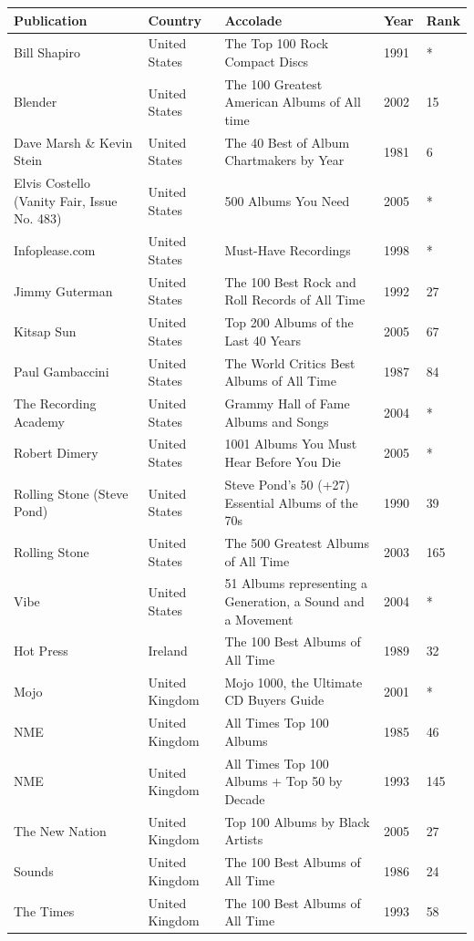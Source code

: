 \documentclass{article}
\begin{document}
\begin{tabular}{lllll}
\toprule
Publication & Country & Accolade & Year & Rank \\
\midrule
Bill Shapiro & United States & The Top 100 Rock Compact Discs & 1991 & * \\
Blender & United States & The 100 Greatest American Albums of All time & 2002 & 15 \\
Dave Marsh \& Kevin Stein & United States & The 40 Best of Album Chartmakers by Year & 1981 & 6 \\
Elvis Costello (Vanity Fair, Issue No. 483) & United States & 500 Albums You Need & 2005 & * \\
Infoplease.com & United States & Must-Have Recordings & 1998 & * \\
Jimmy Guterman & United States & The 100 Best Rock and Roll Records of All Time & 1992 & 27 \\
Kitsap Sun & United States & Top 200 Albums of the Last 40 Years & 2005 & 67 \\
Paul Gambaccini & United States & The World Critics Best Albums of All Time & 1987 & 84 \\
The Recording Academy & United States & Grammy Hall of Fame Albums and Songs & 2004 & * \\
Robert Dimery & United States & 1001 Albums You Must Hear Before You Die & 2005 & * \\
Rolling Stone (Steve Pond) & United States & Steve Pond's 50 (+27) Essential Albums of the 70s & 1990 & 39 \\
Rolling Stone & United States & The 500 Greatest Albums of All Time & 2003 & 165 \\
Vibe & United States & 51 Albums representing a Generation, a Sound and a Movement & 2004 & * \\
Hot Press & Ireland & The 100 Best Albums of All Time & 1989 & 32 \\
Mojo & United Kingdom & Mojo 1000, the Ultimate CD Buyers Guide & 2001 & * \\
NME & United Kingdom & All Times Top 100 Albums & 1985 & 46 \\
NME & United Kingdom & All Times Top 100 Albums + Top 50 by Decade & 1993 & 145 \\
The New Nation & United Kingdom & Top 100 Albums by Black Artists & 2005 & 27 \\
Sounds & United Kingdom & The 100 Best Albums of All Time & 1986 & 24 \\
The Times & United Kingdom & The 100 Best Albums of All Time & 1993 & 58 \\

\end{tabular}
\end{document}
